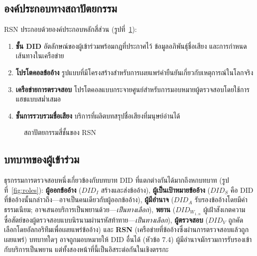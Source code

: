 \documentclass[11pt,a4paper,twocolumn]{article}
\begin{document}
\subsection{องค์ประกอบทางสถาปัตยกรรม}

RSN ประกอบด้วยองค์ประกอบหลักสี่ส่วน (รูปที่~\ref{fig:architecture}):
\begin{enumerate}[nosep]
\item \textbf{ชั้น DID} อัตลักษณ์ของผู้เข้าร่วมพร้อมกฎที่ประกาศไว้ ข้อมูลอภิพันธุ์ชื่อเสียง และการกำหนดเส้นทางในเครือข่าย
\item \textbf{โปรโตคอลข้ออ้าง} รูปแบบที่มีโครงสร้างสำหรับการเผยแพร่คำยืนยันเกี่ยวกับเหตุการณ์ในโลกจริง
\item \textbf{เครือข่ายการตรวจสอบ} โปรโตคอลแบบกระจายศูนย์สำหรับการมอบหมายผู้ตรวจสอบโดยใช้การแฮชแบบสม่ำเสมอ
\item \textbf{ชั้นการรวบรวมชื่อเสียง} บริการที่ผลิตบทสรุปชื่อเสียงที่มนุษย์อ่านได้
\end{enumerate}

\begin{figure}[ht]
\centering
{}
\caption{สถาปัตยกรรมสี่ชั้นของ RSN}
\label{fig:architecture}
\end{figure}

\subsection{บทบาทของผู้เข้าร่วม}

ธุรกรรมการตรวจสอบหนึ่งเกี่ยวข้องกับบทบาท DID ที่แตกต่างกันได้มากถึงหกบทบาท (รูปที่~\ref{fig:roles}): \textbf{ผู้ออกข้ออ้าง} ($DID_I$ สร้างและส่งข้ออ้าง), \textbf{ผู้เป็นเป้าหมายข้ออ้าง} ($DID_S$ คือ DID ที่ข้ออ้างนั้นกล่าวถึง---อาจเป็นคนเดียวกับผู้ออกข้ออ้าง), \textbf{ผู้มีอำนาจ} ($DID_A$ รับรองข้ออ้างโดยมีค่าธรรมเนียม; อาจเสนอบริการเป็นพยานด้วย---\emph{เป็นทางเลือก}), \textbf{พยาน} ($DID_{W_{1..n}}$ ผู้เฝ้าสังเกตความซื่อสัตย์ของผู้ตรวจสอบแบบนิรนามผ่านรหัสท้าทาย---\emph{เป็นทางเลือก}), \textbf{ผู้ตรวจสอบ} ($DID_V$ ถูกคัดเลือกโดยอัลกอริทึมเพื่อเผยแพร่ข้ออ้าง) และ \textbf{RSN} (เครือข่ายที่ข้ออ้างซึ่งผ่านการตรวจสอบแล้วถูกเผยแพร่) บทบาทใดๆ อาจถูกมอบหมายให้ DID อื่นได้ (หัวข้อ 7.4) ผู้มีอำนาจมักรวมการรับรองเข้ากับบริการเป็นพยาน แต่ทั้งสองหน้าที่นี้เป็นอิสระต่อกันในเชิงตรรกะ
\end{document}
